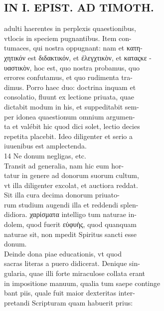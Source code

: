 \documentclass{article}
\begin{document}
\begin{pages}
\section*{IN I. EPIST. AD TIMOTH. \\
                }
adulti haerentes in perplexis quaestionibus, \\
                vtlocis in speciem pugnantibus. Item con- \\
                tumaces, qui nostra oppugnant: nam et κατη- \\
                χητικόν est διδακτικόν, et ἐλεγχτικὸν, et καταςκε - \\
                υαστικὸν, hoc est, quo nostra probamus, quo \\
                errores confutamus, et quo rudimenta tra- \\
                dimus. Porro haec duo: doctrina inquam et \\
                consolatio, fluunt ex lectione priuata, quae \\
                dictabit modum in his, et suppeditabit sem- \\
                per idonea quaestionum omnium argumen- \\
                ta et valébit hic quod dici solet, lectio decies \\
                repetita placebit. Ideo diligenter et serio a \\
                iuuenibus est amplectenda. \\
                14  Ne donum negligas, etc. \\
                Transit ad generalia, nam hic eum hor- \\
                tatur in genere ad donorum suorum cultum, \\
                vt illa diligenter excolat, et auctiora reddat. \\
                Sit illa cura decima donorum priuato- \\
                rum studium augendi illa et reddendi splen- \\
                didiora. χαρίσματα intelligo tum naturae in- \\
                dolem, quod fuerit εὐφυὴς, quod quanquam \\
                naturae sit, non mpedit Spiritus sancti esse \\
                donum. \\
                Deinde dona piae educationis, vt quod \\
                sacras literas a puero didicerat. Denique sin- \\
                gularia, quae illi forte miraculose collata erant \\
                in impositione manuum, qualia tum saepe continge \\
                bant piis, quale fuit maior dexteritas inter- \\
                pretandi Scripturam quam habuerit prius: \\
                

\end{pages}
\end{document}
